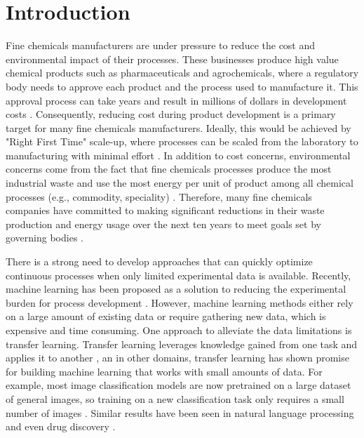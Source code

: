 \chapter{Introduction}\label{ch:introduction}

Fine chemicals manufacturers are under pressure to reduce the cost and environmental impact of their processes. These businesses produce high value chemical products such as pharmaceuticals and agrochemicals, where a regulatory body needs to approve each product and the process used to manufacture it. This approval process can take years and result in millions of dollars in development costs \cite{Prasad2017}. Consequently, reducing cost during product development is a primary target for many fine chemicals manufacturers. Ideally, this would be achieved by "Right First Time" scale-up, where processes can be scaled from the laboratory to manufacturing with minimal effort \cite{Poechlauer2013}. In addition to cost concerns, environmental concerns come from the fact that fine chemicals processes produce the most industrial waste and use the most energy per unit of product among all chemical processes (e.g., commodity, speciality) \cite{Sheldon2018}. Therefore, many fine chemicals companies have committed to making significant reductions in their waste production and energy usage over the next ten years to meet goals set by governing bodies \cite{BASF2020}.


There is a strong need to develop approaches that can quickly optimize continuous processes when only limited experimental data is available. Recently, machine learning has been proposed as a solution to reducing the experimental burden for process development \cite{Taylor2023a}.  However, machine learning methods either rely on a large amount of existing data or require gathering new data, which is expensive and time consuming.  One approach to alleviate the data limitations is transfer learning. Transfer learning leverages knowledge gained from one task and applies it to another \cite{Zhuang2021}, an in other domains, transfer learning has shown promise for building machine learning that works with small amounts of data. For example, most image classification models are now pretrained on a large dataset of general images, so training on a new classification task only requires a small number of images \cite{He2016}. Similar results have been seen in natural language processing \cite{Brown2020} and even drug discovery \cite{Ramsundar2017}. 

